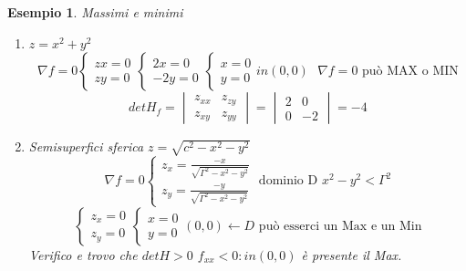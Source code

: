 \documentclass{book}
\newtheorem{esempio}{Esempio}
\begin{document}
\begin{esempio}
  Massimi e minimi
  \begin{enumerate}
  \item $z=x^2+y^2$
    \begin{equation*}
      \nabla f=0 \begin{cases}
                   zx=0\\
                   zy=0
                 \end{cases}\begin{cases}
                   2x=0\\
                   -2y=0
                 \end{cases}\begin{cases}
                   x=0\\
                   y=0
                 \end{cases} in (0,0)\text{ }\nabla f=0 \text{ può MAX o MIN}
    \end{equation*}
    \begin{equation*}
		det H_f=\begin{vmatrix}
			z_{xx} & z_{zy} \\
			z_{xy} & z_{yy}
		\end{vmatrix}=\begin{vmatrix}
			2 & 0 \\
			0 & -2
		\end{vmatrix} =-4
    \end{equation*}
    \item Semisuperfici sferica $z=\sqrt{c^2-x^2-y^2}$
		\begin{equation*}
			\nabla f=0 \begin{cases}
				z_x=\frac{-x}{\sqrt{\Gamma^2-x^2-y^2}}\\
				z_y=\frac{-y}{\sqrt{\Gamma^2-x^2-y^2}}
			\end{cases} \text{ dominio D } x^2-y^2<\Gamma^2 
		\end{equation*}
		\begin{equation*}
			\begin{cases}
				z_x=0\\
				z_y=0
			\end{cases}\begin{cases}
					x=0\\
					y=0
			\end{cases} (0,0)\leftarrow D \text{ può esserci un Max e un Min}
		\end{equation*}
		  Verifico e trovo che $det H>0$ $f_{xx}<0: in(0,0)$ è presente il Max.

\end{enumerate}
\end{esempio}
\end{document}
